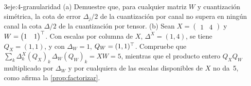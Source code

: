 \begin{ejercicio}{3}{eje:4-granularidad}
(a) Demuestre que, para cualquier matriz $W$ y cuantización simétrica, la cota de error $\Delta_j/2$ de la cuantización por canal no supera en ningún canal la cota $\Delta/2$ de la cuantización por tensor. (b) Sean $X=\begin{pmatrix}1 & 4\end{pmatrix}$ y $W=\begin{pmatrix}1 & 1\end{pmatrix}^{\top}$. Con escalas por columna de $X$, $\Delta^{X}=(1,4)$, se tiene $Q_X=(1,1)$, y con $\Delta_W=1$, $Q_W=(1,1)^{\top}$. Compruebe que $\sum_k\Delta^{X}_{k}(Q_X)_{k}\,\Delta_W(Q_W)_{k}=XW=5$, mientras que el producto entero $Q_XQ_W$ multiplicado por $\Delta_W$ y por cualquiera de las escalas disponibles de $X$ no da~5, como afirma la \cref{prop:factorizar}.
\end{ejercicio}
